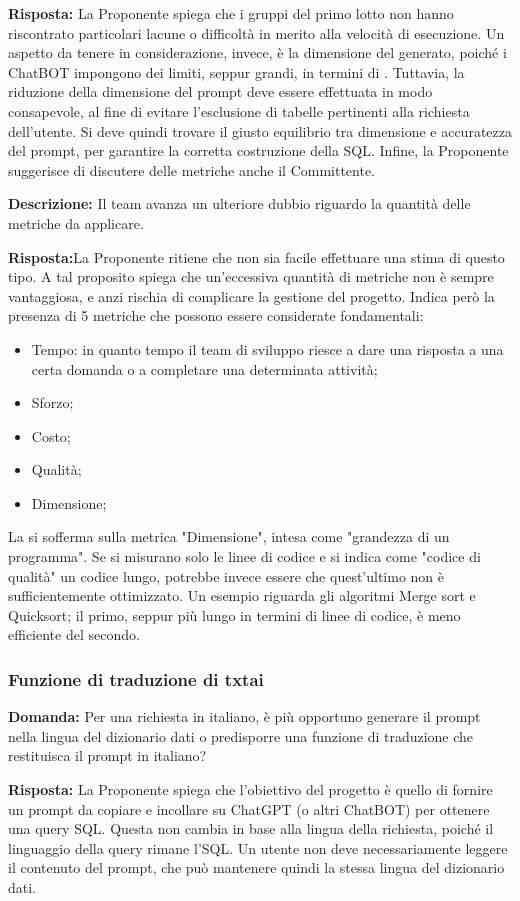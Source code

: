 \par \textbf{Risposta:} La Proponente spiega che i gruppi del primo lotto non hanno riscontrato particolari lacune o difficoltà in merito alla velocità di esecuzione. Un aspetto da tenere in considerazione, invece, è la dimensione del  generato, poiché i ChatBOT impongono dei limiti, seppur grandi, in termini di .
Tuttavia, la riduzione della dimensione del prompt deve essere effettuata in modo consapevole, al fine di evitare l'esclusione di tabelle pertinenti alla richiesta dell'utente. Si deve quindi trovare il giusto equilibrio tra dimensione e accuratezza del prompt, per garantire la corretta costruzione della  SQL.
Infine, la Proponente suggerisce di discutere delle metriche anche il Committente.

\par \textbf{Descrizione:} Il team avanza un ulteriore dubbio riguardo la quantità delle metriche da applicare.

\par \textbf{Risposta:}La Proponente ritiene che non sia facile effettuare una stima di questo tipo. A tal proposito spiega che un'eccessiva quantità di metriche non è sempre vantaggiosa, e anzi rischia di complicare la gestione del progetto. Indica però la presenza di 5 metriche che possono essere considerate fondamentali:
\begin{itemize}
	\item Tempo: in quanto tempo il team di sviluppo riesce a dare una risposta a una certa domanda o a completare una determinata attività;
	\item Sforzo;
	\item Costo;
	\item Qualità;
	\item Dimensione;
\end{itemize}
La  si sofferma sulla metrica "Dimensione", intesa come "grandezza di un programma". Se si misurano solo le linee di codice e si indica come "codice di qualità" un codice lungo, potrebbe invece essere che quest'ultimo non è sufficientemente ottimizzato. Un esempio riguarda gli algoritmi Merge sort e Quicksort; il primo, seppur più lungo in termini di linee di codice, è meno efficiente del secondo.

\subsubsection{Funzione di traduzione di txtai}
\par \textbf{Domanda:} Per una richiesta in italiano, è più opportuno generare il prompt nella lingua del dizionario dati o predisporre una funzione di traduzione che restituisca il prompt in italiano?

\par \textbf{Risposta:} La Proponente spiega che l'obiettivo del progetto è quello di fornire un prompt da copiare e incollare su ChatGPT (o altri ChatBOT) per ottenere una query SQL. Questa non cambia in base alla lingua della richiesta, poiché il linguaggio della query rimane l'SQL. Un utente non deve necessariamente leggere il contenuto del prompt, che può mantenere quindi la stessa lingua del dizionario dati.
